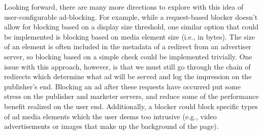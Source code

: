 Looking forward, there are many more directions to explore with this idea of user-configurable ad-blocking.
For example, while a request-based blocker doesn't allow for blocking based on a display size threshold, one similar option that could be implemented is blocking based on media element size (i.e., in bytes).
The size of an element is often included in the metadata of a redirect from an advertiser server, so blocking based on a simple check could be implemented trivially.
One issue with this approach, however, is that we must still go through the chain of redirects which determine what ad will be served and log the impression on the publisher's end.
Blocking an ad after these requests have occurred put some stress on the publisher and marketer servers, and reduce some of the performance benefit realized on the user end.
Additionally, a blocker could block specific types of ad media elements which the user deems too intrusive (e.g., video advertisements or images that make up the background of the page).
